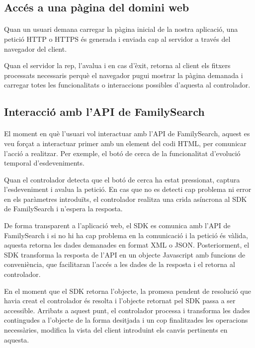     \subsection{Accés a una pàgina del domini web}

    \paragraph{}
    Quan un usuari demana carregar la pàgina inicial de la nostra aplicació, una petició HTTP o HTTPS és generada i enviada cap al servidor a través del navegador del client.

    Quan el servidor la rep, l'avalua i en cas d'èxit, retorna al client els fitxers processats necessaris perquè el navegador pugui mostrar la pàgina demanada i carregar totes les funcionalitats o interaccions possibles d'aquesta al controlador.


    \subsection{Interacció amb l'API de FamilySearch}

    \paragraph{}
    El moment en què l'usuari vol interactuar amb l'API de FamilySearch, aquest es veu forçat a interactuar primer amb un element del codi HTML, per comunicar l’acció a realitzar. Per exemple, el botó de cerca de la funcionalitat d'evolució temporal d'esdeveniments.

    Quan el controlador detecta que el botó de cerca ha estat pressionat, captura l'esdeveniment i avalua la petició. En cas que no es detecti cap problema ni error en els paràmetres introduïts, el controlador realitza una crida asíncrona al SDK de FamilySearch i n'espera la resposta.

    De forma transparent a l'aplicació web, el SDK es comunica amb l’API de Family\-Search i si no hi ha cap problema en la comunicació i la petició és vàlida, aquesta retorna les dades demanades en format XML o JSON. Posteriorment, el SDK transforma la resposta de l’API en un objecte Javascript amb funcions de conveniència, que facilitaran l'accés a les dades de la resposta i el retorna al controlador.

    En el moment que el SDK retorna l'objecte, la promesa pendent de resolució que havia creat el controlador és resolta i l'objecte retornat pel SDK passa a ser accessible. Arribats a aquest punt, el controlador processa i transforma les dades contingudes a l'objecte de la forma desitjada i un cop finalitzades les operacions necessàries, modifica la vista del client introduint els canvis pertinents en aquesta.


